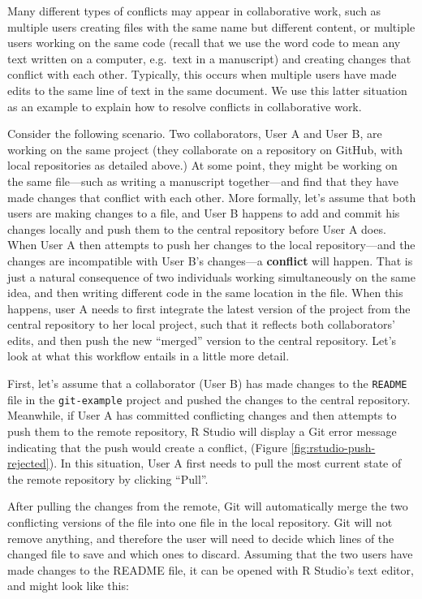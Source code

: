 \documentclass[
  american,
  ,doc,floatsintext]{apa6}
\begin{document}
Many different types of conflicts may appear in collaborative work, such as multiple users creating files with the same name but different content, or multiple users working on the same code (recall that we use the word code to mean any text written on a computer, e.g.~text in a manuscript) and creating changes that conflict with each other. Typically, this occurs when multiple users have made edits to the same line of text in the same document. We use this latter situation as an example to explain how to resolve conflicts in collaborative work.

Consider the following scenario. Two collaborators, User A and User B, are working on the same project (they collaborate on a repository on GitHub, with local repositories as detailed above.) At some point, they might be working on the same file---such as writing a manuscript together---and find that they have made changes that conflict with each other. More formally, let's assume that both users are making changes to a file, and User B happens to add and commit his changes locally and push them to the central repository before User A does. When User A then attempts to push her changes to the local repository---and the changes are incompatible with User B's changes---a \textbf{conflict} will happen. That is just a natural consequence of two individuals working simultaneously on the same idea, and then writing different code in the same location in the file. When this happens, user A needs to first integrate the latest version of the project from the central repository to her local project, such that it reflects both collaborators' edits, and then push the new \enquote{merged} version to the central repository. Let's look at what this workflow entails in a little more detail.

First, let's assume that a collaborator (User B) has made changes to the \texttt{README} file in the \texttt{git-example} project and pushed the changes to the central repository. Meanwhile, if User A has committed conflicting changes and then attempts to push them to the remote repository, R Studio will display a Git error message indicating that the push would create a conflict, (Figure \ref{fig:rstudio-push-rejected}). In this situation, User A first needs to pull the most current state of the remote repository by clicking \enquote{Pull}.

After pulling the changes from the remote, Git will automatically merge the two conflicting versions of the file into one file in the local repository. Git will not remove anything, and therefore the user will need to decide which lines of the changed file to save and which ones to discard. Assuming that the two users have made changes to the README file, it can be opened with R Studio's text editor, and might look like this:
\end{document}

